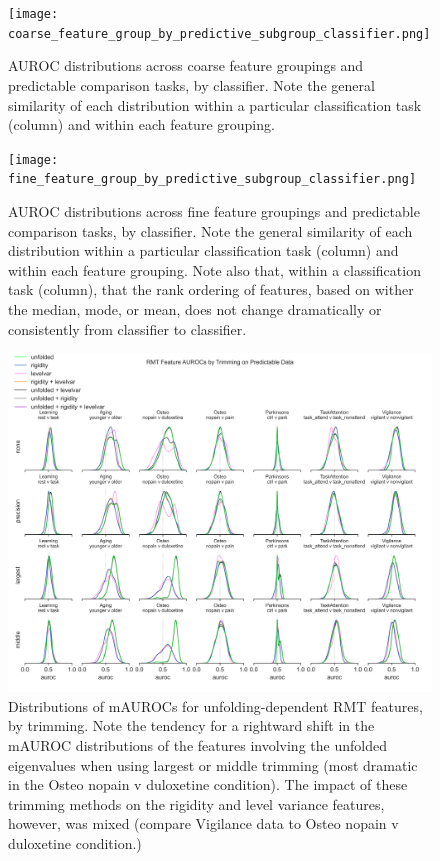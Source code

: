 \documentclass{article}  %
\begin{document}
\begin{figure}[H]
\begin{center}
\texttt{[image: coarse\_feature\_group\_by\_predictive\_subgroup\_classifier.png]}
\end{center}
\caption
{ \label{fig:coarse-classifier} AUROC distributions across coarse feature
groupings and predictable comparison tasks, by classifier. Note the general
similarity of each distribution within a particular classification task
(column) and within each feature grouping.}
\end{figure}



\begin{figure}[H]
\begin{center}
\texttt{[image: fine\_feature\_group\_by\_predictive\_subgroup\_classifier.png]}
\end{center}
\caption
{ \label{fig:fine-classifier} AUROC distributions across fine feature groupings
and predictable comparison tasks, by classifier. Note the general similarity of
each distribution within a particular classification task (column) and within
each feature grouping. Note also that, within a classification task (column),
that the rank ordering of features, based on wither the median, mode, or mean,
does not change dramatically or consistently from classifier to classifier. }
\end{figure}

\begin{figure}[H]
\begin{center}
\includegraphics[width=\textwidth,height=0.9\textheight,keepaspectratio]{rmt_feature_auroc_by_trim.png}
\end{center}
\caption
{ \label{fig:fine-trim} Distributions of mAUROCs for unfolding-dependent RMT
features, by trimming. Note the tendency for a rightward shift in the mAUROC
distributions of the features involving the unfolded eigenvalues when using
largest or middle trimming (most dramatic in the Osteo nopain v duloxetine
condition). The impact of these trimming methods on the rigidity and level
variance features, however, was mixed (compare Vigilance data to Osteo nopain v
duloxetine condition.)}
\end{figure}
\end{document}
